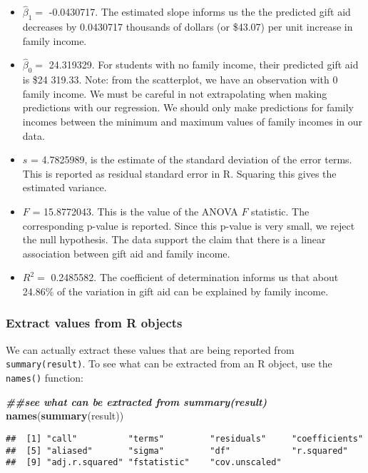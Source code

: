 \documentclass[
]{book}
\newenvironment{Shaded}{\begin{snugshade}}{\end{snugshade}}
\newcommand{\DocumentationTok}[1]{\textcolor[rgb]{0.56,0.35,0.01}{\textbf{\textit{#1}}}}
\newcommand{\FunctionTok}[1]{\textcolor[rgb]{0.13,0.29,0.53}{\textbf{#1}}}
\newcommand{\NormalTok}[1]{#1}
\providecommand{\tightlist}{%
  \setlength{\itemsep}{0pt}\setlength{\parskip}{0pt}}
\begin{document}
\begin{itemize}
\tightlist
\item
  \(\hat{\beta}_1 =\) -0.0430717. The estimated slope informs us the the predicted gift aid decreases by 0.0430717 thousands of dollars (or \$43.07) per unit increase in family income.
\item
  \(\hat{\beta}_0 =\) 24.319329. For students with no family income, their predicted gift aid is \$24 319.33. Note: from the scatterplot, we have an observation with 0 family income. We must be careful in not extrapolating when making predictions with our regression. We should only make predictions for family incomes between the minimum and maximum values of family incomes in our data.
\item
  \(s\) = 4.7825989, is the estimate of the standard deviation of the error terms. This is reported as residual standard error in R. Squaring this gives the estimated variance.
\item
  \(F\) = 15.8772043. This is the value of the ANOVA \(F\) statistic. The corresponding p-value is reported. Since this p-value is very small, we reject the null hypothesis. The data support the claim that there is a linear association between gift aid and family income.
\item
  \(R^2 =\) 0.2485582. The coefficient of determination informs us that about 24.86\% of the variation in gift aid can be explained by family income.
\end{itemize}

\hypertarget{extract-values-from-r-objects}{%
\subsubsection*{Extract values from R objects}\label{extract-values-from-r-objects}}

We can actually extract these values that are being reported from \texttt{summary(result)}. To see what can be extracted from an R object, use the \texttt{names()} function:

\begin{Shaded}
\begin{Highlighting}[]
\DocumentationTok{\#\#see what can be extracted from summary(result)}
\FunctionTok{names}\NormalTok{(}\FunctionTok{summary}\NormalTok{(result))}
\end{Highlighting}
\end{Shaded}

\begin{verbatim}
##  [1] "call"          "terms"         "residuals"     "coefficients" 
##  [5] "aliased"       "sigma"         "df"            "r.squared"    
##  [9] "adj.r.squared" "fstatistic"    "cov.unscaled"
\end{verbatim}
\end{document}
